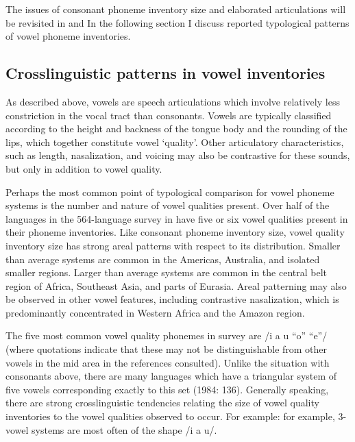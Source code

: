   The issues of consonant phoneme inventory size and elaborated articulations will be revisited in  and  In the following section I discuss reported typological patterns of vowel phoneme inventories.

\subsection{Crosslinguistic patterns in vowel inventories}\label{sec:4.1.2}

  As described above, vowels are speech articulations which involve relatively less constriction in the vocal tract than consonants. Vowels are typically classified according to the height and backness of the tongue body and the rounding of the lips, which together constitute vowel ‘quality’. Other articulatory characteristics, such as length, nasalization, and voicing may also be contrastive for these sounds, but only in addition to vowel quality.

  Perhaps the most common point of typological comparison for vowel phoneme systems is the number and nature of vowel qualities present. Over half of the languages in the 564-language survey in \citet{Maddieson2013c} have five or six vowel qualities present in their phoneme inventories. Like consonant phoneme inventory size, vowel quality inventory size has strong areal patterns with respect to its distribution. Smaller than average systems are common in the Americas, Australia, and isolated smaller regions. Larger than average systems are common in the central belt region of Africa, Southeast Asia, and parts of Eurasia. Areal patterning may also be observed in other vowel features, including contrastive nasalization, which is predominantly concentrated in Western Africa and the Amazon region.

  The five most common vowel quality phonemes in  survey are /i a u “o” “e”/ (where quotations indicate that these may not be distinguishable from other vowels in the mid area in the references consulted). Unlike the situation with consonants above, there are many languages which have a triangular system of five vowels corresponding exactly to this set (1984: 136). Generally speaking, there are strong crosslinguistic tendencies relating the size of vowel quality inventories to the vowel qualities observed to occur. For example: for example, 3-vowel systems are most often of the shape /i a u/. 

